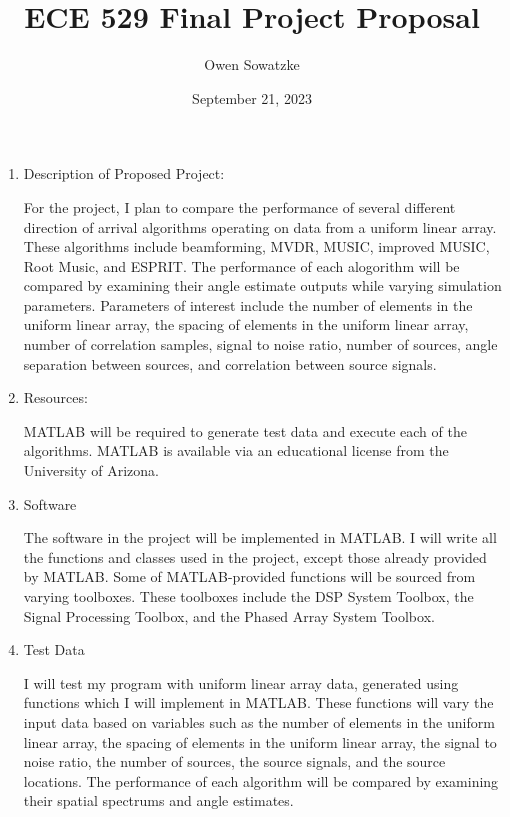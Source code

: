 \documentclass{article}
\title{ECE 529 Final Project Proposal}
\author{Owen Sowatzke}
\date{September 21, 2023}
\begin{document}
	\maketitle

	\begin{enumerate}
		\item Description of Proposed Project:
		
			For the project, I plan to compare the performance of several different direction of arrival algorithms operating on data from a uniform linear array. These algorithms include beamforming, MVDR, MUSIC, improved MUSIC, Root Music, and ESPRIT. The performance of each alogorithm will be compared by examining their angle estimate outputs while varying simulation parameters. Parameters of interest include the number of elements in the uniform linear array, the spacing of elements in the uniform linear array, number of correlation samples, signal to noise ratio, number of sources, angle separation between sources, and correlation between source signals. 
			
		\item Resources:
		
			MATLAB will be required to generate test data and execute each of the algorithms. MATLAB is available via an educational license from the University of Arizona.
			
		\item Software
		
			The software in the project will be implemented in MATLAB. I will write all the functions and classes used in the project, except those already provided by MATLAB. Some of MATLAB-provided functions will be sourced from varying toolboxes. These toolboxes include the DSP System Toolbox, the Signal Processing Toolbox, and the Phased Array System Toolbox.
			
		\item Test Data	
			
			I will test my program with uniform linear array data, generated using functions which I will implement in MATLAB. These functions will vary the input data based on variables such as the number of elements in the uniform linear array, the spacing of elements in the uniform linear array, the signal to noise ratio, the number of sources, the source signals, and the source locations. The performance of each algorithm will be compared by examining their spatial spectrums and angle estimates.
			
	\end{enumerate}	
	
	\nocite{doa_algorithms_raghu}
	\nocite{mvdr_montlouis}
	\nocite{capon_sanudin}
	\nocite{music_chowdhury}
	\nocite{improved_music_gupta}
	\nocite{root_music_esprit_patwari}
	\nocite{esprit_ning}
	\newpage
	{}
	
\end{document}
